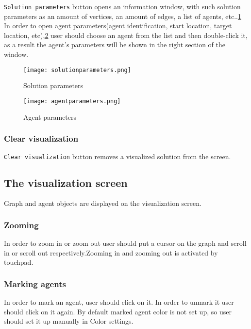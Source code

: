 \documentclass[thesis=B,english]{FITthesis}[2019/12/23]
\begin{document}
\verb|Solution parameters| button opens an information window, with such solution parameters as an amount of vertices, an amount of edges, a list of agents, etc..\ref{fig:float22} In order to open agent parameters(agent identification, start location, target location, etc),\ref{fig:float23} user should choose an agent from the list and then double-click it, as a result the agent's parameters will be shown in the right section of the window.

\begin{figure}
	\texttt{[image: solutionparameters.png]}
	\caption[Start visualization]{Solution parameters}\label{fig:float22}
\end{figure}

\begin{figure}
	\texttt{[image: agentparameters.png]}
	\caption[Start visualization]{Agent parameters}\label{fig:float23}
\end{figure}



\subsubsection{Clear visualization}

\verb|Clear visualization| button removes a visualized solution from the screen.

\subsection{The visualization screen}

Graph and agent objects are displayed on the visualization screen. 

\subsubsection{Zooming}

In order to zoom in or zoom out user should put a cursor on the graph and scroll in or scroll out respectively.Zooming in and zooming out is activated by touchpad. 

\subsubsection{Marking agents}

In order to mark an agent, user should click on it. In order to unmark it user should click on it again. By default marked agent color is not set up, so user should set it up manually in Color settings.
\end{document}
